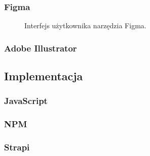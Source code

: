\documentclass[12pt]{article}
\numberwithin{figure}{section}
\begin{document}
\begin{sloppypar}

\subsubsection{Figma}



\begin{figure}[H] 
    \centering
   \caption{Interfejs użytkownika narzędzia Figma.}
   \label{fig:figma-1.jpg}
\end{figure}


\subsubsection{Adobe Illustrator}



\subsection{Implementacja}


\subsubsection{JavaScript}


\subsubsection{NPM}


\subsubsection{Strapi}


\end{sloppypar}
\end{document}
